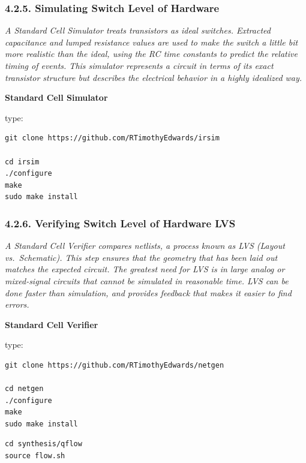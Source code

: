 \documentclass[
]{article}
\begin{document}
\hypertarget{simulating-switch-level-of-hardware-1}{%
\subsubsection{4.2.5. Simulating Switch Level of
Hardware}\label{simulating-switch-level-of-hardware-1}}

\emph{A Standard Cell Simulator treats transistors as ideal switches.
Extracted capacitance and lumped resistance values are used to make the
switch a little bit more realistic than the ideal, using the RC time
constants to predict the relative timing of events. This simulator
represents a circuit in terms of its exact transistor structure but
describes the electrical behavior in a highly idealized way.}

\textbf{Standard Cell Simulator}

type:

\begin{verbatim}
git clone https://github.com/RTimothyEdwards/irsim

cd irsim
./configure
make
sudo make install
\end{verbatim}

\hypertarget{verifying-switch-level-of-hardware-lvs-1}{%
\subsubsection{4.2.6. Verifying Switch Level of Hardware
LVS}\label{verifying-switch-level-of-hardware-lvs-1}}

\emph{A Standard Cell Verifier compares netlists, a process known as LVS
(Layout vs.~Schematic). This step ensures that the geometry that has
been laid out matches the expected circuit. The greatest need for LVS is
in large analog or mixed-signal circuits that cannot be simulated in
reasonable time. LVS can be done faster than simulation, and provides
feedback that makes it easier to find errors.}

\textbf{Standard Cell Verifier}

type:

\begin{verbatim}
git clone https://github.com/RTimothyEdwards/netgen

cd netgen
./configure
make
sudo make install
\end{verbatim}

\begin{verbatim}
cd synthesis/qflow
source flow.sh
\end{verbatim}
\end{document}
